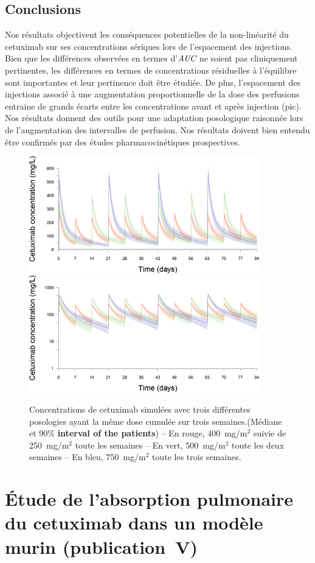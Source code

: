 \subsection{Conclusions}
Nos résultats objectivent les conséquences potentielles de la non-linéarité du cetuximab sur ses concentrations sériques lors de l'espacement des injections. Bien que les différences observées en termes d'$\operatorname{\textit{AUC}}$ ne soient pas cliniquement pertinentes, les différences en termes de concentrations résiduelles à l'équilibre sont importantes et leur pertinence doit être étudiée. De plus, l'espacement des injections associé à une augmentation proportionnelle de la dose des perfusions entraine de grands écarts entre les concentrations avant et après injection (pic). Nos résultats donnent des outils pour une adaptation posologique raisonnée lors de l'augmentation des intervalles de perfusion. Nos résultats doivent bien entendu être confirmés par des études pharmacocinétiques prospectives.
\begin{figure}[htbp]
	\centering
		\includegraphics[width=10cm]{figures/raster/FIG_32a}
		\includegraphics[width=10cm]{figures/raster/FIG_32b}
	\caption{Concentrations de cetuximab simulées avec trois différentes posologies ayant la même dose cumulée sur trois semaines.(Médiane et 90\% \textbf{interval of the patients}) – En rouge, 400~mg/m$^2$ suivie de 250~mg/m$^2$ toute les semaines – En vert, 500~mg/m$^2$ toute les deux semaines – En bleu, 750~mg/m$^2$ toute les trois semaines.}
	\label{fig:32}
\end{figure}
\section{Étude de l'absorption pulmonaire du cetuximab dans un modèle murin (publication~V)}

